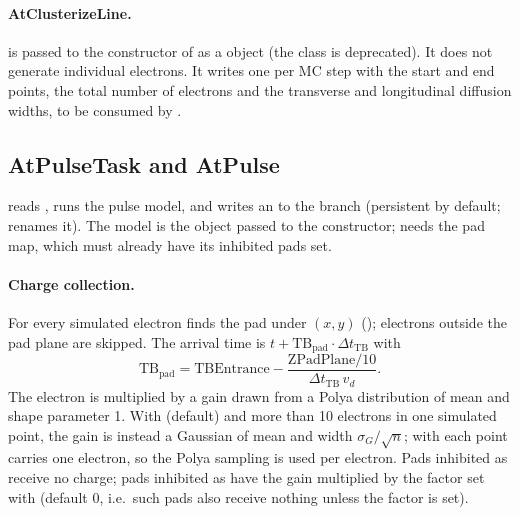 \paragraph{AtClusterizeLine.}  is passed to the constructor of
 as a  object (the class
 is deprecated). It does not generate individual electrons. It writes one
 per MC step with the start and end points, the total number of electrons and
the transverse and longitudinal diffusion widths, to be consumed by .

\subsection{AtPulseTask and AtPulse}

 reads , runs the pulse model, and writes an
 to the branch  (persistent by default;
 renames it). The model is the  object passed to the
constructor;  needs the pad map, which must already have its inhibited pads set.

\paragraph{Charge collection.} For every simulated electron 
finds the pad under $(x,y)$ (); electrons outside the pad plane are
skipped. The arrival time is $t + \mathrm{TB}_\mathrm{pad}\cdot\Delta t_\mathrm{TB}$ with
\[
\mathrm{TB}_\mathrm{pad} = \mathrm{TBEntrance} -
\frac{\mathrm{ZPadPlane}/10}{\Delta t_\mathrm{TB}\, v_d}.
\]
The electron is multiplied by a gain drawn from a Polya distribution of mean  and shape
parameter 1. With  (default) and more than 10 electrons in one simulated
point, the gain is instead a Gaussian of mean  and width $\sigma_G/\sqrt{n}$; with
 each point carries one electron, so the Polya sampling is used per electron.
Pads inhibited as  receive no charge; pads inhibited as
 have the gain multiplied by the factor set with  (default 0,
i.e.\ such pads also receive nothing unless the factor is set).

